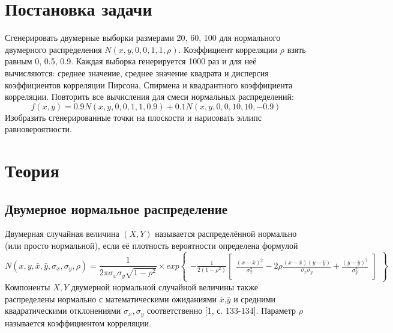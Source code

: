 \documentclass[a4paper]{article}
\begin{document}
    
    \tableofcontents
    \newpage
    \listoftables
    \newpage
    \section {Постановка задачи}
        \noindent Сгенерировать двумерные выборки размерами 20, 60, 100 для нормального двумерного распределения $N(x,y,0,0,1,1,\rho)$. Коэффициент корреляции $\rho$ взять равным 0, 0.5, 0.9. Каждая выборка генерируется 1000 раз и для неё вычисляются: среднее значение, среднее значение квадрата и дисперсия коэффициентов корреляции Пирсона, Спирмена и квадрантного коэффициента корреляции. Повторить все вычисления для смеси нормальных распределений:
        \begin{equation}
        f(x,y) = 0.9N(x,y,0,0,1,1,0.9) + 0.1N(x,y,0,0,10,10,-0.9)
        \end{equation}
        \noindent Изобразить сгенерированные точки на плоскости и нарисовать эллипс равновероятности.

    \section{Теория}
        \subsection{Двумерное нормальное распределение}
            \noindent Двумерная случайная величина $(X,Y)$ называется распределённой нормально (или просто нормальной), если её плотность вероятности определена формулой
            \begin{equation}
                N(x, y, \bar{x}, \bar{y}, \sigma_{x}, \sigma_{y}, \rho) =
                \frac{1}{2\pi\sigma_{x}\sigma_{y}\sqrt{1-\rho^{2}}} \times
                exp{\begin{Bmatrix}
                        -\frac{1}{2(1-\rho^{2})}
                        \begin{bmatrix}
                            \frac{(x-\bar{x})^{2}}{\sigma_{x}^{2}} - 2\rho\frac{(x-\bar{x})(y-\bar{y})}{\sigma_{x}\sigma_{y}} + \frac{(y-\bar{y})^{2}}{\sigma_{y}^{2}}
                        \end{bmatrix}
                    \end{Bmatrix}}
            \end{equation}
            Компоненты $X,Y$ двумерной нормальной случайной величины также распределены нормально с математическими ожиданиями $\bar{x}$,$\bar{y}$ и средними квадратическими отклонениями $\sigma_{x},\sigma_{y}$ соответственно [1, с. 133-134].
            Параметр $\rho$ называется коэффициентом корреляции.
\end{document}
